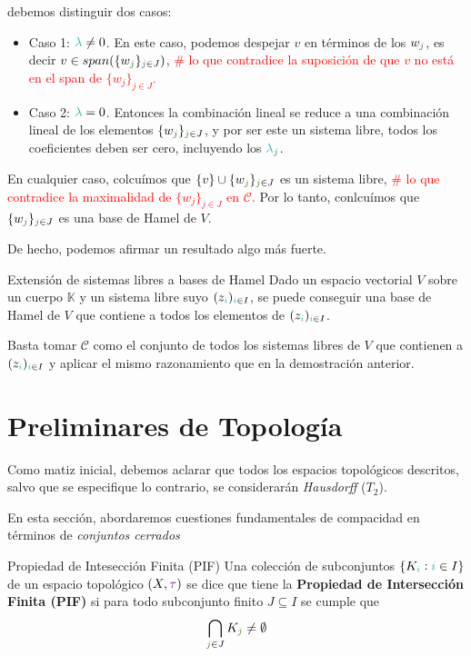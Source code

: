 \documentclass[titlepage,11pt,a4paper]{book}
\newcommand{\ii}{\ensuremath{\textcolor{TealBlue}{i}}}
\newcommand{\jj}{\ensuremath{\textcolor{OliveGreen}{j}}}
\newcommand{\KK}{\ensuremath{\mathbb{K}}}
\newcommand{\lamb}{\textcolor{TealBlue}{\lambda}}
\newcommand{\taut}{\textcolor{Fuchsia}{\tau}}
\begin{document}
\begin{dem}
debemos distinguir dos casos:
\begin{itemize}
    \item Caso 1: $\lamb \neq 0$. En este caso, podemos despejar $v$ en términos de los $w_{\jj}$, es decir $v \in span(\{w_{\jj}\}_{\jj \in J})$, \textcolor{red}{\# lo que contradice la suposición de que $v$ no está en el span de $\{w_{j}\}_{j \in J}$.} 
    \item Caso 2: $\lamb = 0$. Entonces la combinación lineal se reduce a una combinación lineal de los elementos $\{w_{\jj}\}_{\jj \in J}$, y por ser este un sistema libre, todos los coeficientes deben ser cero, incluyendo los $\lamb_{\jj}$.
\end{itemize}

\smallskip
En cualquier caso, colcuímos que $\{v\} \cup \{w_{\jj}\}_{\jj \in J}$ es un sistema libre,  \textcolor{red}{\# lo que contradice la maximalidad de $\{w_{j}\}_{j \in J}$ en $\mathcal{C}$.} Por lo tanto, conlcuímos que $\{w_{\jj}\}_{\jj \in J}$ es una base de Hamel de $V$.
\end{dem}


De hecho, podemos afirmar un resultado algo más fuerte.

\begin{cor*}{Extensión de sistemas libres a bases de Hamel}
Dado un espacio vectorial $V$ sobre un cuerpo $\KK$ y un sistema libre suyo $(z_{\ii})_{\ii \in I}$, se puede conseguir una base de Hamel de  $V$ que contiene a todos los elementos de $(z_{\ii})_{\ii \in I}$.
\end{cor*}
\begin{dem}
Basta tomar $\mathcal C$ como el conjunto de todos los sistemas libres de $V$ que contienen a $(z_{\ii})_{\ii \in I}$ y aplicar el mismo razonamiento que en la demostración anterior.  
\end{dem}   


\section*{Preliminares de Topología}
Como matiz inicial, debemos aclarar que todos los espacios topológicos descritos, salvo que se especifique lo contrario, se considerarán \textit{Hausdorff} ($T_{2}$).

\medskip
En esta sección, abordaremos cuestiones fundamentales de compacidad en términos de \textit{conjuntos cerrados}

\begin{defn*}{Propiedad de Intesección Finita (PIF)}
    Una colección de subconjuntos $\{K_{\ii} : \ii \in I\}$ de un espacio topológico $(X, \taut)$ se dice que tiene la \textbf{Propiedad de Intersección Finita (PIF)} si para todo subconjunto finito $J \subseteq I$ se cumple que
    \[
    \bigcap_{\jj \in J} K_{\jj} \neq \emptyset
    \]
\end{defn*}
\end{document}
